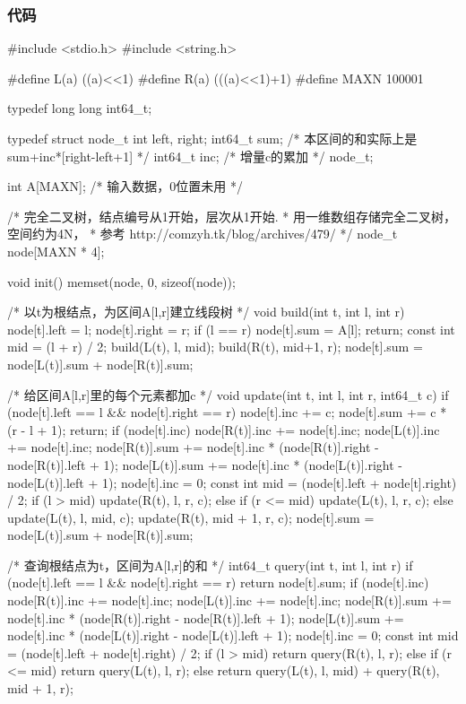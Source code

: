 \subsubsection{代码}
\begin{Codex}[label=poj3468.c]
#include <stdio.h>
#include <string.h>

#define L(a) ((a)<<1)
#define R(a) (((a)<<1)+1)
#define MAXN 100001

typedef long long int64_t;

typedef struct node_t {
    int left, right;
    int64_t sum;  /* 本区间的和实际上是sum+inc*[right-left+1] */
    int64_t inc;  /* 增量c的累加 */
} node_t;

int A[MAXN]; /* 输入数据，0位置未用 */

/* 完全二叉树，结点编号从1开始，层次从1开始.
 * 用一维数组存储完全二叉树，空间约为4N，
 * 参考 http://comzyh.tk/blog/archives/479/
 */
node_t node[MAXN * 4];

void init() {
    memset(node, 0, sizeof(node));
}

/* 以t为根结点，为区间A[l,r]建立线段树 */
void build(int t, int l, int r) {
    node[t].left = l;
    node[t].right = r;
    if (l == r) {
        node[t].sum = A[l];
        return;
    }
    const int mid = (l + r) / 2;
    build(L(t), l, mid);
    build(R(t), mid+1, r);
    node[t].sum = node[L(t)].sum + node[R(t)].sum;
}

/* 给区间A[l,r]里的每个元素都加c */
void update(int t, int l, int r, int64_t c) {
    if (node[t].left == l && node[t].right == r) {
        node[t].inc += c;
        node[t].sum += c * (r - l + 1);
        return;
    }
    if (node[t].inc) {
        node[R(t)].inc += node[t].inc;
        node[L(t)].inc += node[t].inc;
        node[R(t)].sum += node[t].inc * (node[R(t)].right - node[R(t)].left + 1);
        node[L(t)].sum += node[t].inc * (node[L(t)].right - node[L(t)].left + 1);
        node[t].inc = 0;
    }
    const int mid = (node[t].left + node[t].right) / 2;
    if (l > mid)
        update(R(t), l, r, c);
    else if (r <= mid)
        update(L(t), l, r, c);
    else {
        update(L(t), l, mid, c);
        update(R(t), mid + 1, r, c);
    }
    node[t].sum = node[L(t)].sum + node[R(t)].sum;
}

/* 查询根结点为t，区间为A[l,r]的和 */
int64_t query(int t, int l, int r) {
    if (node[t].left == l && node[t].right == r)
        return node[t].sum;
    if (node[t].inc) {
        node[R(t)].inc += node[t].inc;
        node[L(t)].inc += node[t].inc;
        node[R(t)].sum += node[t].inc * (node[R(t)].right - node[R(t)].left + 1);
        node[L(t)].sum += node[t].inc * (node[L(t)].right - node[L(t)].left + 1);
        node[t].inc = 0;
    }
    const int mid = (node[t].left + node[t].right) / 2;
    if (l > mid)
        return query(R(t), l, r);
    else if (r <= mid)
        return query(L(t), l, r);
    else
        return query(L(t), l, mid) + query(R(t), mid + 1, r);
}


\end{Codex}

